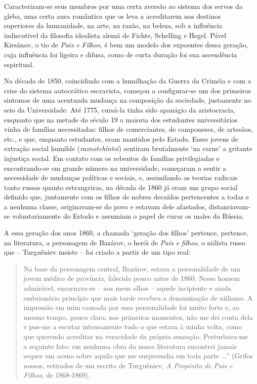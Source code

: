 Caracterizam-se seus membros por uma certa aversão ao sistema dos servos
da gleba, uma certa aura romântica que os leva a acreditarem nos
destinos superiores da humanidade, na arte, na razão, na beleza, sob a
influência indiscutível da filosofia idealista alemã de Fichte,
Schelling e Hegel. Pável Kirsánov, o tio de \emph{Pais e Filhos}, é bem
um modelo dos expoentes dessa geração, cuja influência foi ligeira e
difusa, como de curta duração foi sua ascendência espiritual.

Na década de 1850, coincidindo com a humilhação da Guerra da Criméia e
com a crise do sistema autocrático escravista, começou a configurar-se
um dos primeiros sintomas de uma acentuada mudança na composição da
sociedade, justamente no seio da Universidade. Até 1775, cursá-la tinha
sido apanágio da aristocracia, enquanto que na metade do século 19 a
maioria dos estudantes universitários vinha de famílias necessitadas:
filhos de comerciantes, de camponeses, de artesãos, etc., e que,
enquanto estudantes, eram mantidos pelo Estado. Esses jovens de extração
social humilde (\emph{raznotchíntsi}) sentiram brutalmente `na carne' a
gritante injustiça social. Em contato com os rebentos de famílias
privilegiadas e encontrando-se em grande número na universidade,
começaram a sentir a necessidade de mudanças políticas e sociais, e,
assimilando as teorias radicais tanto russas quanto estrangeiras, na
década de 1860 já eram um grupo social definido que, juntamente com os
filhos de nobres decaídos pertencentes a todas e a nenhuma classe,
originavam-se do povo e estavam dele afastados, distanciavam-se
voluntariamente do Estado e assumiam o papel de curar os males da
Rússia.

A essa geração dos anos 1860, a chamada `geração dos filhos' pertence,
pertence, na literatura, a personagem de Bazárov, o herói de \emph{Pais
e filhos}, o niilista russo que -- Turguêniev insiste -- foi criado a
partir de um tipo real:

\begin{quote}
Na base da personagem central, Bazárov, estava a personalidade de um
jovem médico de província, falecido pouco antes de 1860. Nesse homem
admirável, encarnava-se -- aos meus olhos -- aquele incipiente e ainda
embrionário princípio que mais tarde recebeu a denominação de niilismo.
A impressão em mim causada por essa personalidade foi muito forte e, ao
mesmo tempo, pouco clara; nos primeiros momentos, não me dei conta dela
e pus-me a escutar intensamente tudo o que estava à minha volta, como
que querendo acreditar na veracidade da própria sensação. Perturbava-me
o seguinte fato: em nenhuma obra da nossa literatura encontrei jamais
sequer um aceno sobre aquilo que me surpreendia em toda parte ...''
(Grifos nossos, retirados de um escrito de Turguêniev, \emph{A Propósito
de Pais e Filhos}, de 1868-1869).
\end{quote}

